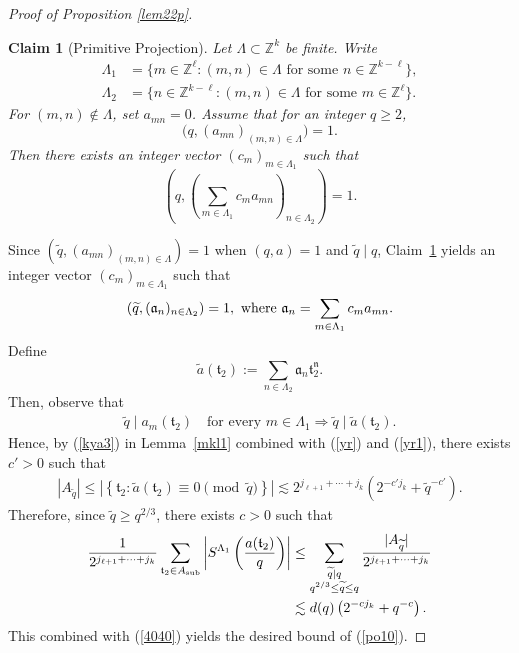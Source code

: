 \documentclass[11 pt,letterpaper]{amsart}
\theoremstyle{plain}
\newtheorem{claim}{Claim}\numberwithin{claim}{section}
\theoremstyle{definition}
\theoremstyle{remark} \theoremstyle{exam} \theoremstyle{ob}
\numberwithin{equation}{section}
\begin{document}
\begin{proof}[Proof of Proposition \ref{lem22p}]
	\begin{claim}[Primitive Projection]\label{hc1}
		Let $\Lambda\subset \mathbb Z^k$ be finite. Write
		\begin{align*}
			\Lambda_1
			&=
			\bigl\{
			m\in\mathbb{Z}^{\ell}
			:
			(m,n)\in\Lambda
			\text{ for some } n\in\mathbb{Z}^{k-\ell}
			\bigr\},\\
			\Lambda_2
			&=
			\bigl\{
			n\in\mathbb{Z}^{k-\ell}
			:
			(m,n)\in\Lambda
			\text{ for some } m\in\mathbb{Z}^{\ell}
			\bigr\}.
		\end{align*}
		For $(m,n)\notin\Lambda$, set $a_{mn}=0$. Assume that for an integer $q\ge 2$, 
		\[
		\bigl(q,(a_{mn})_{(m,n)\in\Lambda}\bigr)=1.
		\]
		Then there exists an  integer vector $(c_m)_{m\in \Lambda_1}$ such that
		\[
		\!\left(
		q,
		\left(\sum_{m\in \Lambda_1} c_m a_{mn}\right)_{n\in\Lambda_2}
		\right)=1.
		\]
	\end{claim}
	Since $(\widetilde q,(a_{mn})_{(m,n)\in \Lambda})=1$ when $(q,a)=1$ and $\widetilde q\mid q$,
	Claim~\ref{hc1} yields an integer vector
	$(c_m)_{m\in\Lambda_1}$ such that
\begin{align}\label{yr}
		(\widetilde q,
	(\mathfrak a_{n})_{n\in\Lambda_2})
	=1,\ \text{where
		$
		\mathfrak a_{n}
		=
		\sum_{m\in\Lambda_1}
		c_m a_{mn}.
		$}
\end{align}
	Define
	\[
	\widetilde a(\mathfrak t_2)
	:=
	\sum_{n\in\Lambda_2}
	\mathfrak a_{n}
	\mathfrak t_2^{\mathfrak n}.
	\]
	Then, observe that 
	\begin{align}\label{yr1}
	\widetilde q
	\mid
	a_m(\mathfrak t_2)
	\quad
	\text{for every }
	m\in\Lambda_1 \Rightarrow \widetilde q
	\mid
	\widetilde a(\mathfrak t_2).	
	\end{align}
	Hence, by (\ref{kya3}) in Lemma~\ref{mkl1} combined with (\ref{yr}) and (\ref{yr1}), there exists $c'>0$ such that
	\begin{align*}
		|A_{\widetilde q}|
		\le
		\left|
		\left\{
		\mathfrak t_2
		:
		\widetilde a(\mathfrak t_2)
		\equiv0
		\pmod{\widetilde q}
		\right\}
		\right|  
		\lesssim 
		2^{j_{\ell+1}+\cdots+j_k}
		(2^{-c'j_k}
		+\widetilde q^{-c'}).
	\end{align*}
Therefore,	since $\widetilde q\ge q^{2/3}$, there exists $c>0$ such that
	\begin{align*}
		\frac1{2^{j_{\ell+1}+\cdots+j_k}}
		\sum_{\mathfrak t_2\in A_{\rm sub}}
		\left|
		S^{\Lambda_1}
		\left(
		\frac{a(\mathfrak t_2)}{q}
		\right)
		\right|   
		&\le
		\sum_{\substack{\widetilde q\mid q\\
				q^{2/3}\le\widetilde q\le q}}
		\frac{|A_{\widetilde q}|}
		{2^{j_{\ell+1}+\cdots+j_k}}    \\
		&\lesssim d(q)
		\left(
		2^{-cj_k}
		+
		q^{-c}
		\right).
	\end{align*}
	This combined with (\ref{4040}) yields the desired bound of (\ref{po10}). 
\end{proof}
	
\end{document}
